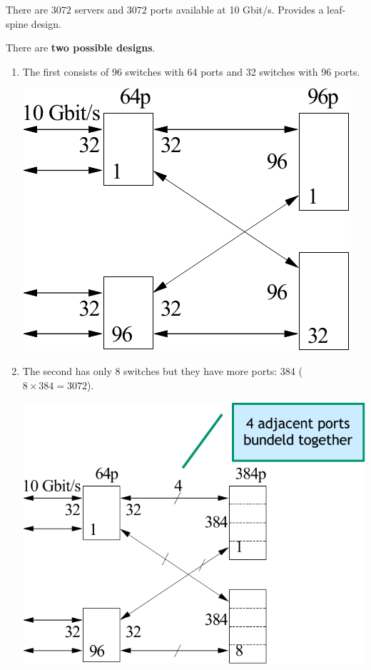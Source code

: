 \newpage

\begin{examplebox}
    There are $3072$ servers and $3072$ ports available at 10 Gbit/s. Provides a leaf-spine design.

    There are \textbf{two possible designs}.
    \begin{enumerate}
        \item The first consists of 96 switches with 64 ports and 32 switches with 96 ports.
        \begin{center}
            \includegraphics[width=.4\textwidth]{img/networking-6.pdf}
        \end{center}
        
        \item The second has only 8 switches but they have more ports: 384 ($8 \times 384 = 3072$).
        \begin{center}
            \includegraphics[width=.5\textwidth]{img/networking-7.pdf}
        \end{center}
    \end{enumerate}
\end{examplebox}

